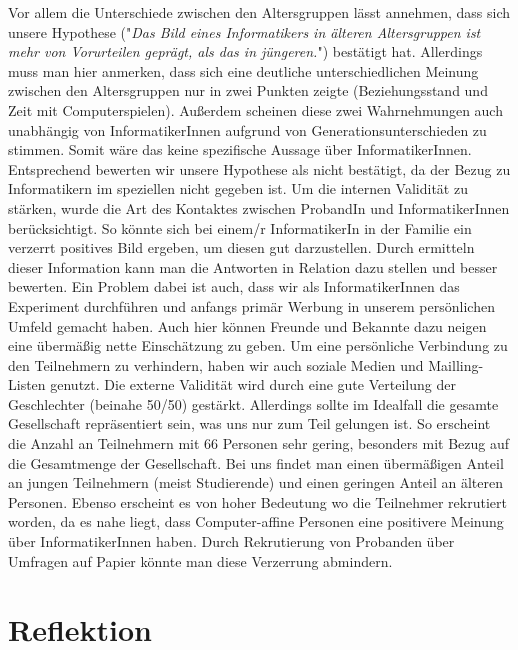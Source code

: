 \documentclass[de]{agse-empir-report}\usepackage[]{graphicx}\usepackage[]{color}
\begin{document}
Vor allem die Unterschiede zwischen den Altersgruppen lässt annehmen, dass sich unsere Hypothese ("\textit{Das Bild eines Informatikers in älteren Altersgruppen ist mehr von Vorurteilen geprägt, als das in jüngeren.}") bestätigt hat. Allerdings muss man hier anmerken, dass sich eine deutliche unterschiedlichen Meinung zwischen den Altersgruppen nur in zwei Punkten zeigte (Beziehungsstand und Zeit mit Computerspielen). Außerdem scheinen diese zwei Wahrnehmungen auch unabhängig von InformatikerInnen aufgrund von Generationsunterschieden zu stimmen. Somit wäre das keine spezifische Aussage über InformatikerInnen. Entsprechend bewerten wir unsere Hypothese als nicht bestätigt, da der Bezug zu Informatikern im speziellen nicht gegeben ist.
Um die internen Validität zu stärken, wurde die Art des Kontaktes zwischen ProbandIn und InformatikerInnen berücksichtigt. So könnte sich bei einem/r InformatikerIn in der Familie ein verzerrt positives Bild ergeben, um diesen gut darzustellen. Durch ermitteln dieser Information kann man die Antworten in Relation dazu stellen und besser bewerten. Ein Problem dabei ist auch, dass wir als InformatikerInnen das Experiment durchführen und anfangs primär Werbung in unserem persönlichen Umfeld gemacht haben. Auch hier können Freunde und Bekannte dazu neigen eine übermäßig nette Einschätzung zu geben. Um eine persönliche Verbindung zu den Teilnehmern zu verhindern, haben wir auch soziale Medien und Mailling-Listen genutzt.  
Die externe Validität wird durch eine gute Verteilung der Geschlechter (beinahe 50/50) gestärkt. Allerdings sollte im Idealfall die gesamte Gesellschaft repräsentiert sein, was uns nur zum Teil gelungen ist. So erscheint die Anzahl an Teilnehmern mit 66 Personen sehr gering, besonders mit Bezug auf die Gesamtmenge der Gesellschaft. Bei uns findet man einen übermäßigen Anteil an jungen Teilnehmern (meist Studierende) und einen geringen Anteil an älteren Personen. Ebenso erscheint es von hoher Bedeutung wo die Teilnehmer rekrutiert worden, da es nahe liegt, dass Computer-affine Personen eine positivere Meinung über InformatikerInnen haben. Durch Rekrutierung von Probanden über Umfragen auf Papier könnte man diese Verzerrung abmindern.

\section[jk]{Reflektion}
\end{document}
